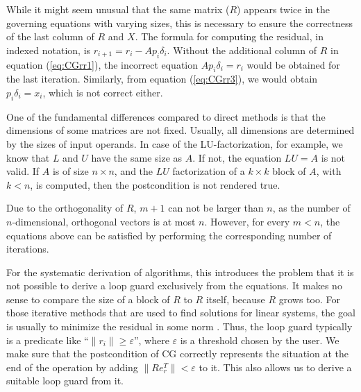 While it might seem unusual that the same matrix ($R$) appears twice in the governing equations with varying sizes, this is necessary to ensure the correctness of the last column of $R$ and $X$.  The formula for computing the residual, in indexed notation, is $r_{i+1} = r_i - A p_i \delta_i$. Without the additional column of $R$ in equation (\ref{eq:CGrr1}), the incorrect equation $A p_i \delta_i = r_i$ would be obtained for the last iteration. Similarly, from equation (\ref{eq:CGrr3}), we would obtain $p_i \delta_i = x_i$, which is not correct either.

One of the fundamental differences compared to direct methods is that the dimensions of some matrices are not fixed. 
Usually, all dimensions are determined by the sizes of input operands. In case of the LU-factorization, for example, we know that $L$ and $U$ have the same size as $A$. If not, the equation $LU = A$ is not valid. If $A$ is of size $n \times n$, and the $LU$ factorization of a $k \times k$ block of $A$, with $k < n$, is computed, then the postcondition is not rendered true.

Due to the orthogonality of $R$, $m + 1$ can not be larger than $n$, as the number of $n$-dimensional, orthogonal vectors is at most $n$. However, for every $m < n$, the equations above can be satisfied by performing the corresponding number of iterations.

For the systematic derivation of algorithms, this introduces the problem that it is not possible to derive a loop guard exclusively from the equations. It makes no sense to compare the size of a block of $R$ to $R$ itself, because $R$ grows too. For those iterative methods that are used to find solutions for linear systems, the goal is usually to minimize the residual in some norm \cite{barrett:templates}. %
Thus, the loop guard typically is a predicate like ``$\| r_i \| \geq \varepsilon$'', where $\varepsilon$ is a threshold chosen by the user. We make sure that the postcondition of CG correctly represents the situation at the end of the operation by adding $\| R e_r^T \| < \varepsilon$ to it. This also allows us to derive a suitable loop guard from it.

